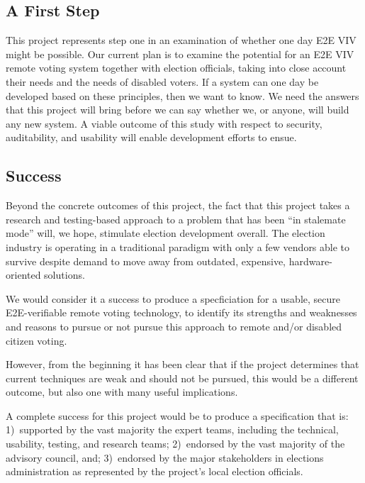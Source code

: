 \subsection{A First Step}
\label{sec:first-step}

This project represents step one in an examination of whether one day
E2E VIV might be possible. Our current plan is to examine the
potential for an E2E VIV remote voting system together with election
officials, taking into close account their needs and the needs of
disabled voters. If a system can one day be developed based on these
principles, then we want to know. We need the answers that this
project will bring before we can say whether we, or anyone, will build
any new system. A viable outcome of this study with respect to
security, auditability, and usability will enable development efforts
to ensue.

\subsection{Success}
\label{sec:success}

Beyond the concrete outcomes of this project, the fact that this
project takes a research and testing-based approach to a problem that
has been “in stalemate mode” will, we hope, stimulate election
development overall. The election industry is operating in a
traditional paradigm with only a few vendors able to survive despite
demand to move away from outdated, expensive, hardware-oriented
solutions.

We would consider it a success to produce a specficiation for a
usable, secure E2E-verifiable remote voting technology, to identify
its strengths and weaknesses and reasons to pursue or not pursue this
approach to remote and/or disabled citizen voting.

However, from the beginning it has been clear that if the project
determines that current techniques are weak and should not be pursued,
this would be a different outcome, but also one with many useful
implications.

A complete success for this project would be to produce a
specification that is: 1)~supported by the vast majority the expert
teams, including the technical, usability, testing, and research
teams; 2)~endorsed by the vast majority of the advisory council, and;
3)~endorsed by the major stakeholders in elections administration as
represented by the project's local election officials.

